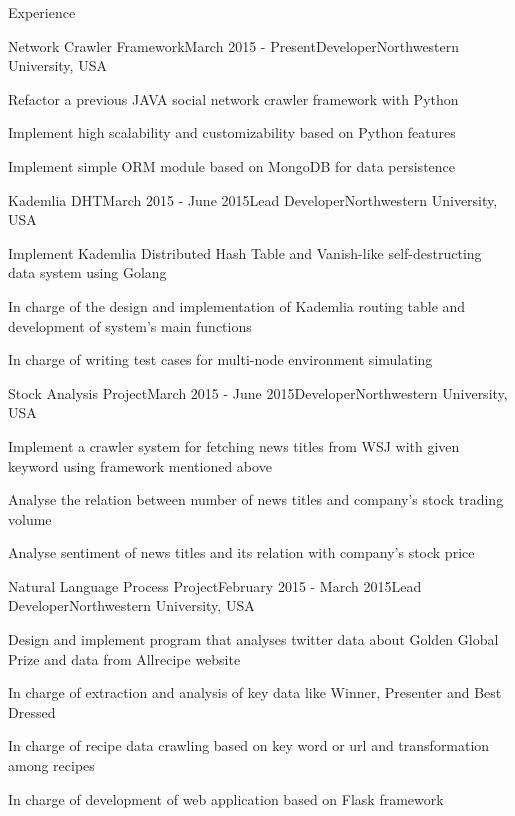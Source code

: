 \documentclass{resume} %
\begin{document}
\begin{rSection}{Experience}

\begin{rSubsection}{Network Crawler Framework}{March 2015 - Present}{Developer}{Northwestern University, USA}
\item Refactor a previous JAVA social network crawler framework with Python
\item Implement high scalability and customizability based on Python features
\item Implement simple ORM module based on MongoDB for data persistence
\end{rSubsection}

\begin{rSubsection}{Kademlia DHT}{March 2015 - June 2015}{Lead Developer}{Northwestern University, USA}
\item Implement Kademlia Distributed Hash Table and Vanish-like self-destructing data system using Golang
\item In charge of the design and implementation of Kademlia routing table and development of system's main functions
\item In charge of writing test cases for multi-node environment simulating
\end{rSubsection}

\begin{rSubsection}{Stock Analysis Project}{March 2015 - June 2015}{Developer}{Northwestern University, USA}
\item Implement a crawler system for fetching news titles from WSJ with given keyword using framework mentioned above
\item Analyse the relation between number of news titles and company's stock trading volume
\item Analyse sentiment of news titles and its relation with company's stock price
\end{rSubsection}

\begin{rSubsection}{Natural Language Process Project}{February 2015 - March 2015}{Lead Developer}{Northwestern University, USA}
\item Design and implement program that analyses twitter data about Golden Global Prize and data from Allrecipe website
\item In charge of extraction and analysis of key data like Winner, Presenter and Best Dressed
\item In charge of recipe data crawling based on key word or url and transformation among recipes
\item In charge of development of web application based on Flask framework
\end{rSubsection}



\end{rSection}
\end{document}
